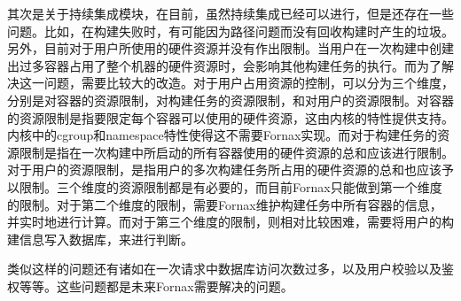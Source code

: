 其次是关于持续集成模块，在目前，虽然持续集成已经可以进行，但是还存在一些问题。比如，在构建失败时，有可能因为路径问题而没有回收构建时产生的垃圾。另外，目前对于用户所使用的硬件资源并没有作出限制。当用户在一次构建中创建出过多容器占用了整个机器的硬件资源时，会影响其他构建任务的执行。而为了解决这一问题，需要比较大的改造。对于用户占用资源的控制，可以分为三个维度，分别是对容器的资源限制，对构建任务的资源限制，和对用户的资源限制。对容器的资源限制是指要限定每个容器可以使用的硬件资源，这由内核的特性提供支持。内核中的cgroup和namespace特性使得这不需要Fornax实现。而对于构建任务的资源限制是指在一次构建中所启动的所有容器使用的硬件资源的总和应该进行限制。对于用户的资源限制，是指用户的多次构建任务所占用的硬件资源的总和也应该予以限制。三个维度的资源限制都是有必要的，而目前Fornax只能做到第一个维度的限制。对于第二个维度的限制，需要Fornax维护构建任务中所有容器的信息，并实时地进行计算。而对于第三个维度的限制，则相对比较困难，需要将用户的构建信息写入数据库，来进行判断。

类似这样的问题还有诸如在一次请求中数据库访问次数过多，以及用户校验以及鉴权等等。这些问题都是未来Fornax需要解决的问题。